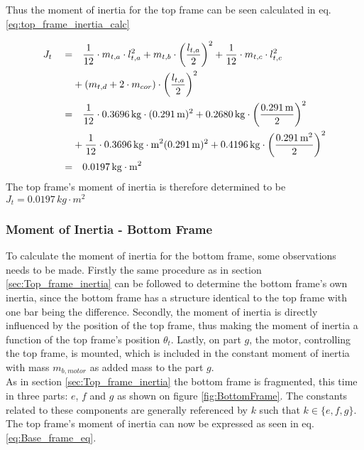 \documentclass[../../main]{subfiles}
\begin{document}
Thus the moment of inertia for the top frame can be seen calculated in eq. \eqref{eq:top_frame_inertia_calc}

\begin{equation}
  \centering
    \label{eq:top_frame_inertia_calc}
  \begin{split}
      J_t  \quad  =&  \quad \frac{1}{12} \cdot m_{t,a} \cdot l_{t,a}^2 + m_{t,b} \cdot \left(\frac{l_{t,a}}{2}\right)^2 + \frac{1}{12} \cdot m_{t,c}\cdot l_{t,c}^2\\
      &+ (m_{t,d} + 2 \cdot m_{cor}) \cdot \left( \frac{l_{t,a}}{2}\right)^2 \\
      =& \quad \frac{1}{12} \cdot 0.3696 \si{\,kg}  \cdot (0.291 \si{\,m})^2
      + 0.2680 \si{\,kg} \cdot \left(\frac{0.291 \si{\,m}}{2}\right)^2 \\
      &+ \frac{1}{12} \cdot 0.3696 \si{\,kg\cdot m^2} (0.291 \si{\,m})^2
      + 0.4196 \si{\,kg} \cdot \left( \frac{0.291\si{\,m}^2}{2} \right)^2 \\
      =& \quad 0.0197 \si{\,kg\cdot m^2}
  \end{split}
\end{equation}
The top frame's moment of inertia is therefore determined to be
\newline $J_{t} = 0.0197 \si{\,kg\cdot m^2}$

\subsubsection{Moment of Inertia - Bottom Frame}
\label{sec:moment_botom}
To calculate the moment of inertia for the bottom frame, some observations needs to be made. Firstly the same procedure as in section \ref{sec:Top_frame_inertia} can be followed to determine the bottom frame's own inertia, since the bottom frame has a structure identical to the top frame with one bar being the difference. Secondly, the moment of inertia is directly influenced by the position of the top frame, thus making the moment of inertia a function of the top frame's position $\theta_t$. Lastly, on part $g$, the motor, controlling the top frame, is mounted, which is included in the constant moment of inertia with mass $m_{b,motor}$ as added mass to the part $g$.\\
As in section \ref{sec:Top_frame_inertia} the bottom frame is fragmented, this time in three parts: $e$, $f$ and $g$ as shown on figure \ref{fig:BottomFrame}. The constants related to these components are generally referenced by $k$ such that $k \in \{e,f,g\}$. The top frame's moment of inertia can now be expressed as seen in eq. \eqref{eq:Base_frame_eq}.
\end{document}

